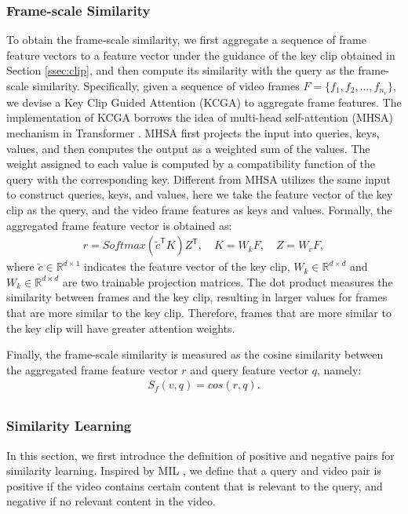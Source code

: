 \documentclass[sigconf]{acmart}
\begin{document}
\subsubsection{Frame-scale Similarity}
To obtain the frame-scale similarity, we first aggregate a sequence of frame feature vectors to a feature vector under the guidance of the key clip obtained in Section \ref{ssec:clip}, and then compute its similarity with the query as the frame-scale similarity. 
Specifically, given a sequence of video frames $F = \{f_1, f_2, ..., f_{n_v}\}$, we devise a Key Clip Guided Attention (KCGA) to aggregate frame features.
The implementation of KCGA borrows the idea of multi-head self-attention (MHSA) mechanism in Transformer \cite{vaswani2017attention}.
MHSA first projects the input into queries, keys, values, and then computes the output as a weighted sum of the values. The weight assigned to each value is computed by a compatibility function of the query with the corresponding key.
Different from MHSA utilizes the same input to construct queries, keys, and values, here we take the feature vector of the key clip as the query, and the video frame features as keys and values. Formally, the aggregated frame feature vector is obtained as:
\begin{equation}
\begin{aligned}
     r = Softmax(\tilde{c}^\mathsf{T}K)Z^\mathsf{T}, \quad
     K = W_k{F}, \quad
     Z = W_v{F}, 
\end{aligned}
\end{equation}
where $\tilde{c}\in\mathbb{R}^{d\times{1}}$ indicates the feature vector of the key clip, $W_k\in\mathbb{R}^{d\times{d}}$ and $W_k\in\mathbb{R}^{d\times{d}}$ are two trainable projection matrices.
The dot product measures the similarity between frames and the key clip, resulting in larger values for frames that are more similar to the key clip. Therefore, frames that are more similar to the key clip will have greater attention weights.

Finally, the frame-scale similarity is measured as the cosine similarity between the aggregated frame feature vector $r$ and query feature vector $q$, namely:
\begin{equation}
\begin{aligned}
     S_f(v, q) = cos(r, q).\\
\end{aligned}
\end{equation}



\subsubsection{Similarity Learning}
In this section, we first introduce the definition of positive and negative pairs for similarity learning.
Inspired by MIL \cite{dietterich1997solving,maron1997framework}, we define that a query and video pair is positive if the video contains certain content that is relevant to the query, and negative if no relevant content in the video. 
\end{document}
